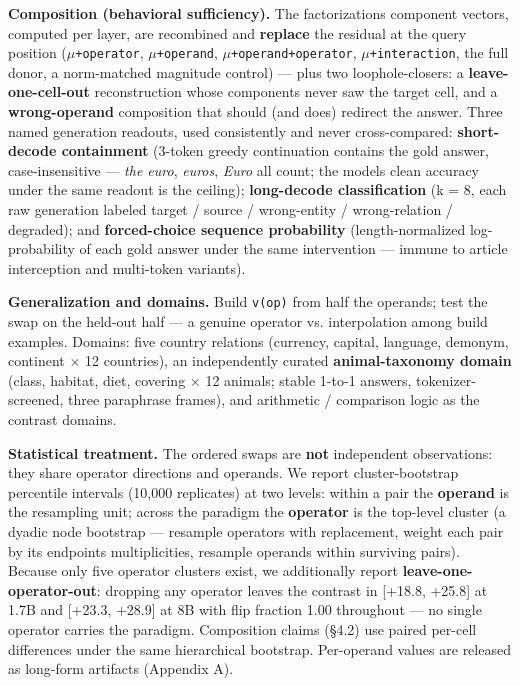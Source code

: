 \textbf{Composition (behavioral sufficiency).} The
factorization\textquotesingle s component vectors, computed per layer,
are recombined and \textbf{replace} the residual at the query position
(\texttt{\ensuremath{\mu}+operator}, \texttt{\ensuremath{\mu}+operand}, \texttt{\ensuremath{\mu}+operand+operator},
\texttt{\ensuremath{\mu}+interaction}, the full donor, a norm-matched magnitude
control) --- plus two loophole-closers: a \textbf{leave-one-cell-out}
reconstruction whose components never saw the target cell, and a
\textbf{wrong-operand} composition that should (and does) redirect the
answer. Three named generation readouts, used consistently and never
cross-compared: \textbf{short-decode containment} (3-token greedy
continuation contains the gold answer, case-insensitive --- \emph{the
euro}, \emph{euros}, \emph{Euro} all count; the model\textquotesingle s
clean accuracy under the same readout is the ceiling);
\textbf{long-decode classification} (k = 8, each raw generation labeled
target / source / wrong-entity / wrong-relation / degraded); and
\textbf{forced-choice sequence probability} (length-normalized
log-probability of each gold answer under the same intervention ---
immune to article interception and multi-token variants).

\textbf{Generalization and domains.} Build \texttt{v(op)} from half the
operands; test the swap on the held-out half --- a genuine operator vs.
interpolation among build examples. Domains: five country relations
(currency, capital, language, demonym, continent \ensuremath{\times} 12 countries), an
independently curated \textbf{animal-taxonomy domain} (class, habitat,
diet, covering \ensuremath{\times} 12 animals; stable 1-to-1 answers, tokenizer-screened,
three paraphrase frames), and arithmetic / comparison logic as the
contrast domains.

\textbf{Statistical treatment.} The ordered swaps are \textbf{not}
independent observations: they share operator directions and operands.
We report cluster-bootstrap percentile intervals (10,000 replicates) at
two levels: within a pair the \textbf{operand} is the resampling unit;
across the paradigm the \textbf{operator} is the top-level cluster (a
dyadic node bootstrap --- resample operators with replacement, weight
each pair by its endpoints\textquotesingle{} multiplicities, resample
operands within surviving pairs). Because only five operator clusters
exist, we additionally report \textbf{leave-one-operator-out}: dropping
any operator leaves the contrast in {[}+18.8, +25.8{]} at 1.7B and
{[}+23.3, +28.9{]} at 8B with flip fraction 1.00 throughout --- no
single operator carries the paradigm. Composition claims (\S{}4.2) use
paired per-cell differences under the same hierarchical bootstrap.
Per-operand values are released as long-form artifacts (Appendix A).

